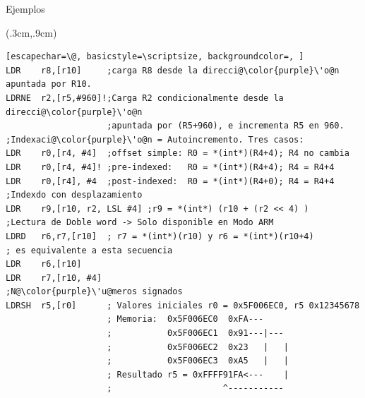 \documentclass[usenames,table,dvipsnames,aspectratio=169]{beamer}
\begin{document}
\begin{frame}[fragile]{Ejemplos}
 \begin{textblock*}{\textwidth}(.3cm,.9cm)%
  \begin{lstlisting}[escapechar=\@, basicstyle=\scriptsize, backgroundcolor=, ] 
LDR    r8,[r10]     ;carga R8 desde la direcci@\color{purple}\'o@n apuntada por R10.
LDRNE  r2,[r5,#960]!;Carga R2 condicionalmente desde la direcci@\color{purple}\'o@n 
                    ;apuntada por (R5+960), e incrementa R5 en 960.
;Indexaci@\color{purple}\'o@n = Autoincremento. Tres casos:
LDR    r0,[r4, #4]  ;offset simple: R0 = *(int*)(R4+4); R4 no cambia
LDR    r0,[r4, #4]! ;pre-indexed:   R0 = *(int*)(R4+4); R4 = R4+4
LDR    r0,[r4], #4  ;post-indexed:  R0 = *(int*)(R4+0); R4 = R4+4
;Indexdo con desplazamiento
LDR    r9,[r10, r2, LSL #4] ;r9 = *(int*) (r10 + (r2 << 4) )
;Lectura de Doble word -> Solo disponible en Modo ARM
LDRD   r6,r7,[r10]  ; r7 = *(int*)(r10) y r6 = *(int*)(r10+4)
; es equivalente a esta secuencia
LDR    r6,[r10]
LDR    r7,[r10, #4]
;N@\color{purple}\'u@meros signados
LDRSH  r5,[r0]      ; Valores iniciales r0 = 0x5F006EC0, r5 0x12345678
                    ; Memoria:  0x5F006EC0  0xFA---
                    ;           0x5F006EC1  0x91---|---
                    ;           0x5F006EC2  0x23   |   |
                    ;           0x5F006EC3  0xA5   |   |
                    ; Resultado r5 = 0xFFFF91FA<---    |
                    ;                      ^-----------                                            
  \end{lstlisting}
 \end{textblock*}
\end{frame}
\end{document}
